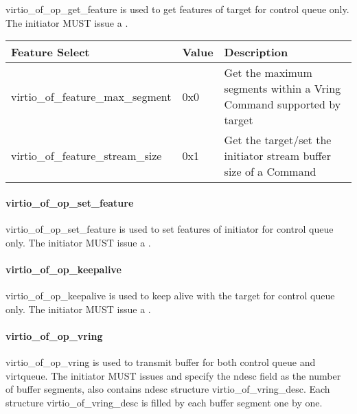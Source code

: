 virtio_of_op_get_feature is used to get features of target for control queue only. The initiator MUST issue a .

\begin{tabular}{ |l|l|l| }
\hline
Feature Select & Value & Description \\
\hline
virtio_of_feature_max_segment & 0x0 & Get the maximum segments within a Vring Command supported by target \\
\hline
virtio_of_feature_stream_size & 0x1 & Get the target/set the initiator stream buffer size of a Command \\
\hline
\end{tabular}

\paragraph{virtio_of_op_set_feature}\label{sec:Virtio Transport Options / Virtio Over Fabrics / Transmission Protocol / Opcodes Definition / virtio_of_op_set_feature}

virtio_of_op_set_feature is used to set features of initiator for control queue only. The initiator MUST issue a .

\paragraph{virtio_of_op_keepalive}\label{sec:Virtio Transport Options / Virtio Over Fabrics / Transmission Protocol / Opcodes Definition / virtio_of_op_keepalive}

virtio_of_op_keepalive is used to keep alive with the target for control queue only. The initiator MUST issue a .

\paragraph{virtio_of_op_vring}\label{sec:Virtio Transport Options / Virtio Over Fabrics / Transmission Protocol / Opcodes Definition / virtio_of_op_vring}

virtio_of_op_vring is used to transmit buffer for both control queue and virtqueue. The initiator MUST issues  and specify the ndesc field as the number of buffer segments, also contains ndesc structure virtio_of_vring_desc. Each structure virtio_of_vring_desc is filled by each buffer segment one by one.

